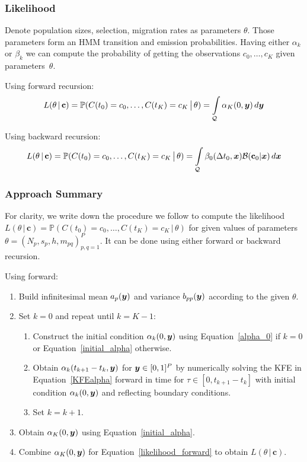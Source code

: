 \documentclass{article}
\def\x{\mbox{\boldmath $x$}}
\def\y{\mbox{\boldmath $y$}}
\def\calB{{\mathcal B}}
\def\calQ{{\mathcal Q}}
\def\P{\mathbb{P}}
\begin{document}
\subsubsection{Likelihood}

Denote population sizes, selection, migration rates as parameters $\theta$.
Those parameters form an HMM transition and emission probabilities.
Having either $\alpha_k$ or $\beta_k$ we can compute the probability of getting the observations $c_{0},\ldots,c_{K}$ given parameters~$\theta$.

Using forward recursion:
\begin{equation}\label{likelihood_forward}
    L(\theta \, | \, \mathbf{c}) = \P(C(t_0) = c_0, \ldots, C(t_K) = c_K\, \big| \, \theta) = \int\limits_\calQ \alpha_K(0, \y)\, d\y
\end{equation}

Using backward recursion:
\begin{equation}\label{likelihood_backward}
    L(\theta \, | \, \mathbf{c}) = \P(C(t_0) = c_0, \ldots, C(t_K) = c_K\, \big| \, \theta) = \int\limits_\calQ \beta_0(\Delta t_0, \x) \calB(\mathbf{c}_0 | \x) \, d\x
\end{equation}

\subsubsection{Approach Summary}

For clarity, we write down the procedure we follow to compute the likelihood $L(\theta \, | \, \mathbf{c}) = \P(C(t_0) = c_0, \ldots, C(t_K) = c_K\, \big| \, \theta)$ for given values of parameters $\theta=(N_p, s_p, h, m_{pq})_{p,q=1}^P$.
It can be done using either forward or backward recursion.

\bigskip

Using forward:
\begin{enumerate}
    \item Build infinitesimal mean $a_p(\y)$ and variance $b_{pp}(\y)$ according to the given $\theta$.
    \item Set $k=0$ and repeat until $k=K-1$:
    \begin{enumerate}
        \item Construct the initial condition $\alpha_k(0, \y)$ using Equation~\ref{alpha_0} if $k=0$ or Equation~\ref{initial_alpha} otherwise.
        \item Obtain $\alpha_k(t_{k+1}-t_k, \y)$ for $\y \in [0,1]^P$ by numerically solving the KFE in Equation~\ref{KFEalpha} forward in time for $\tau \in [0, t_{k+1}-t_k]$ with initial condition $\alpha_k(0, \y)$ and reflecting boundary conditions.
        \item Set $k=k+1$.
    \end{enumerate}
    \item Obtain $\alpha_K(0, \y)$ using Equation~\ref{initial_alpha}.
    \item Combine $\alpha_K(0, \y)$ for Equation~\ref{likelihood_forward} to obtain $L(\theta \, | \, \mathbf{c})$.
\end{enumerate}
\end{document}
